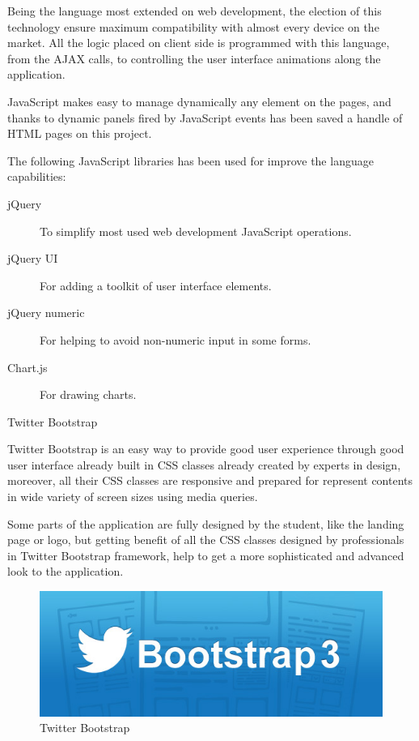 \documentclass{DeustoFDP}
\begin{document}
Being the language most extended on web development, the election of this technology ensure maximum compatibility with almost every device on the market. All the logic placed on client side is programmed with this language, from the AJAX calls, to controlling the user interface animations along the application.

JavaScript makes easy to manage dynamically any element on the pages, and thanks to dynamic panels fired by JavaScript events has been saved a handle of HTML pages on this project.

The following JavaScript libraries has been used for improve the language capabilities:
\begin{description}
	\item[jQuery] To simplify most used web development JavaScript operations.
	\item[jQuery UI] For adding a toolkit of user interface elements.
	\item[jQuery numeric] For helping to avoid non-numeric input in some forms.
	\item[Chart.js] For drawing charts.
\end{description}

{\large Twitter Bootstrap}

Twitter Bootstrap \cite{Twitterbootstrap} is an easy way to provide good user experience through good user interface already built in CSS classes already created by experts in design, moreover, all their CSS classes are responsive and prepared for represent contents in wide variety of screen sizes using media queries.

Some parts of the application are fully designed by the student, like the landing page or logo, but getting benefit of all the CSS classes designed by professionals in Twitter Bootstrap framework, help to get a more sophisticated and advanced look to the application.

\begin{figure}[h]
\centering
\includegraphics[width=0.7\linewidth]{fig/bootstrap-3}
\caption[Twitter Bootstrap]{Twitter Bootstrap}
\label{fig:bootstrap-3}
\end{figure}
\end{document}
